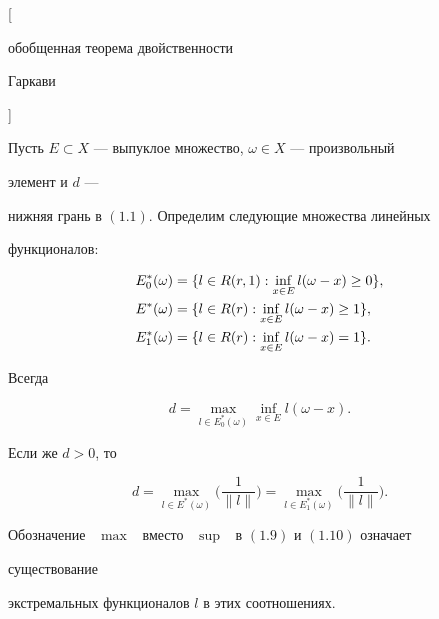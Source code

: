 \begin{thms} 


[{\selectfont обобщенная теорема двойственности 


Гаркави}] 


Пусть $E\subset X$ --- выпуклое множество, $\omega\in X$ --- произвольный 


элемент и $d$ --- 


нижняя грань в $(1.1)$. Определим следующие множества линейных 


функционалов\/${:}$ 


\begin{align} 


E^*_0(\omega)&=\{l\in R(r,1):\inf_{x\in E} 


l(\omega-x)\ge0\}, \notag \\ 


% 


E^*(\omega)&=\{l\in R(r):\inf_{x\in E} 


l(\omega-x)\ge1\}, \\ 


% 


E^*_1(\omega)&=\{l\in R(r):\inf_{x\in E} 


l(\omega-x)=1\}.\notag 


\end{align} 


Всегда 


\begin{equation} 


d=\max_{l\in E^*_0(\omega)} 


\inf_{x\in E}l(\omega-x). 


\end{equation} 


Если же $d>0$, то 


\begin{equation} 


d=\max_{l\in E^*(\omega)}\bigg(\frac{1}{\|l\|} \bigg)= 


\max_{l\in E^*_1(\omega)}\bigg(\frac{1}{\|l\|} \bigg). 


\end{equation} 


Обозначение \ $\max$ \ вместо \ $\sup$ \ в $(1.9)$ и $(1.10)$ означает 


существование 


экстремальных функционалов $l$ в этих соотношениях. 


\end{thms} 


